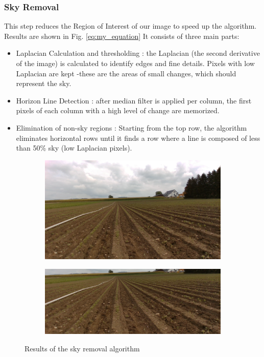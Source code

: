 \subsubsection{Sky Removal}

This step reduces the Region of Interest of our image to speed up the algorithm. Results are shown in Fig. \ref{eq:my_equation} It consists of three main parts: 

\begin{itemize} 
  \item Laplacian Calculation and thresholding : the Laplacian (the second derivative of the image) is calculated to identify edges and fine details. Pixels with low Laplacian are kept -these are the areas of small changes, which should represent the sky.
  \item Horizon Line Detection : after median filter is applied per column, the first pixels of each column with a high level of change are memorized.
  \item Elimination of non-sky regions : Starting from the top row, the algorithm eliminates horizontal rows until it finds a row where a line is composed of less than 50\% sky (low Laplacian pixels).
\end{itemize}

\begin{figure}[H]
\centering
\begin{subfigure}{0.49\textwidth}
    \includegraphics[width=\textwidth]{Report/images/IMGWITHSKY.png}
    \label{fig:first}
\end{subfigure}
\begin{subfigure}{0.49\textwidth}%
    \includegraphics[width=\textwidth]{Report/images/IMGNOSKY.png}
    \label{fig:second}
\end{subfigure}
\caption{Results of the sky removal algorithm}
\end{figure}
\label{pics: Vegewithandwithoutsky}

